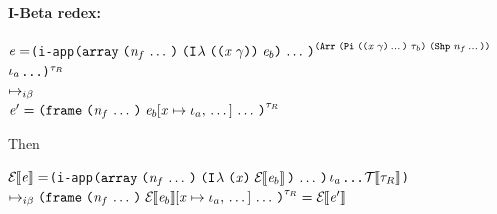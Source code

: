 \begin{sproof}
  \paragraph{I-Beta redex:}
  \newcommand{\ibetafnannot}
  {\typearray
    {\typedprod
      {\sequence{\notevar{\var}{\sort}}}
      {\type_b}}
    {\idxshape{\sequence{\nat_f}}}}
  \newcommand{\ibetafn}
  {\notedarrlit[\ibetafnannot]
    {\sequence{\ilam{\notevar{\var}{\sort}}{\expr_b}}}
    {\sequence{\nat_f}}}
  \newcommand{\ibetaresult}
  {\notedfrm[\type_R]
    {\sequence{\seqsubst{\expr_b}{\var}{\idx_a}}}
    {\sequence{\nat_f}}}
  \newcommand{\erasedibetafn}
  {\arrlit
    {\sequence{\ilam{\var}{\EraseE{\expr_b}}}}
    {\sequence{\nat_f}}}
  \newcommand{\erasedibetaresult}
  {\notedfrm[\type_R]
    {\sequence{\seqsubst{\EraseE{\expr_b}}{\var}{\idx_a}}}
    {\sequence{\nat_f}}}
\begin{alltt}
\(\expr = \)(i-app \(\ibetafn\)\\
\phantom{\(\expr = \) }\(\idx\sb{a}\) ...)\(\sp{\type\sb{R}}\)\\
\(\mapsto\sb{i\beta}\)\\
\(\expr' = \ibetaresult\)
\end{alltt}
Then
\begin{alltt}
\(\EraseE{\expr} = \)(i-app \(\erasedibetafn\) \(\idx\sb{a}\) ... \(\EraseT{\type\sb{R}}\))\\
\(\mapsto\sb{i\beta} \erasedibetaresult = \EraseE{\expr'}\)
\end{alltt}


\end{sproof}
